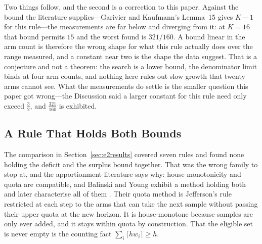 Two things follow, and the second is a correction to this paper. Against the bound the
literature supplies---Garivier and Kaufmann's Lemma~15 gives $K-1$ for this rule---the
measurements are far below and diverging from it: at $K=16$ that bound permits
$15$ and the worst found is $321/160$. A bound linear in the arm count is therefore
the wrong shape for what this rule actually does over the range measured, and a constant near
two is the shape the data suggest. That is a conjecture and not a theorem: the search is a
lower bound, the denominator limit binds at four arm counts, and nothing here rules out slow
growth that twenty arms cannot see. What the measurements do settle is the smaller question
this paper got wrong---the Discussion said a larger constant for this rule need only exceed
$\tfrac32$, and $\tfrac{321}{160}$ is exhibited.

\subsection{A Rule That Holds Both Bounds}
\label{sec:bny}

The comparison in Section~\ref{sec:e2results} covered seven rules and found none holding the
deficit and the surplus bound together. That was the wrong family to stop at, and the
apportionment literature says why: house monotonicity and quota are compatible, and Balinski
and Young exhibit a method holding both \cite{balinski1975} and later characterise all of
them \cite{balinski1979}. Their quota method is Jefferson's rule restricted at each step to
the arms that can take the next sample without passing their upper quota at the new horizon.
It is house-monotone because samples are only ever added, and it stays within quota by
construction. That the eligible set is never empty is the counting fact
$\sum_{i}\lceil h w_{i}\rceil\ge h$.

